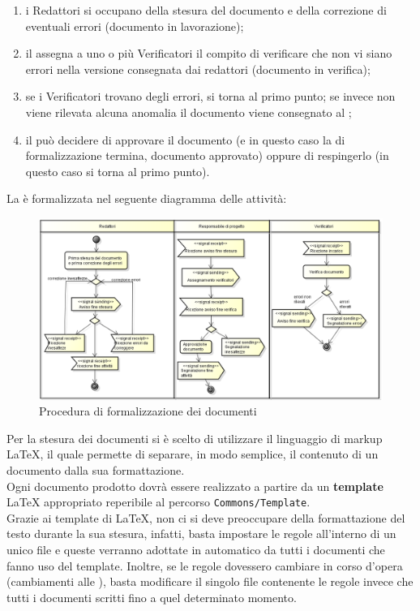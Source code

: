 				\begin{enumerate}
					\item i Redattori si occupano della stesura del documento e della correzione di eventuali errori (documento in lavorazione);
					\item il  assegna a uno o più Verificatori il compito di verificare che non vi siano errori nella versione consegnata dai redattori (documento in verifica);
					\item se i Verificatori trovano degli errori, si torna al primo punto; se invece non viene rilevata alcuna anomalia il documento viene consegnato al ;
					\item il  può decidere di approvare il documento (e in questo caso la  di formalizzazione termina, documento approvato) oppure di respingerlo (in questo caso si torna al primo punto).
				\end{enumerate}
				La  è formalizzata nel seguente diagramma delle attività:
				\begin{figure}[H]
					\centering
					\includegraphics[width=\textwidth]{NormeDiProgetto/Pics/FormalizzazioneDocumenti}
					\caption{Procedura di formalizzazione dei documenti}
				\end{figure}
		Per la stesura dei documenti si è scelto di utilizzare il linguaggio di markup \LaTeX{}, il quale permette di separare, in modo semplice, il contenuto di un documento dalla sua formattazione. \\
		Ogni documento prodotto dovrà essere realizzato a partire da un \textbf{template} \LaTeX{} appropriato reperibile al percorso \texttt{Commons/Template}.\\
		Grazie ai template di \LaTeX{}, non ci si deve preoccupare della formattazione del testo durante la sua stesura, infatti, basta impostare le regole all’interno di un unico file e queste verranno adottate in automatico da tutti i documenti che fanno uso del template. Inoltre, se le regole dovessero cambiare in corso d’opera (cambiamenti alle ), basta modificare il singolo file contenente le regole invece che tutti i documenti scritti fino a quel determinato momento. \\

